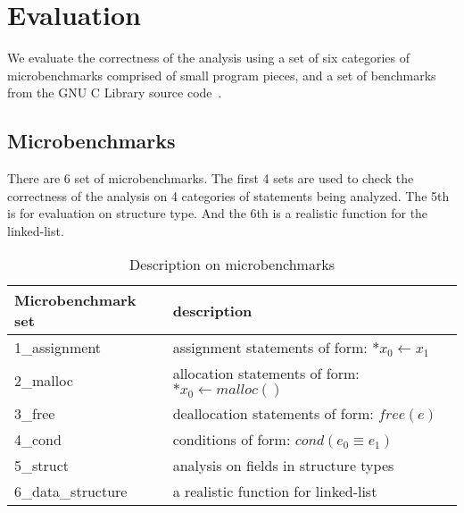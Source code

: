 \section{Evaluation}
\label{s:evaluation}

We evaluate the correctness of the analysis using a set of six categories of 
microbenchmarks comprised of small program pieces, and a set of benchmarks 
from the GNU C Library source code~\cite{glibc}.

\subsection{Microbenchmarks}
\label{microbenchmark}

There are 6 set of microbenchmarks. The first 4 sets are used to check the 
correctness of the analysis on 4 categories of statements being analyzed. 
The 5th is for evaluation on structure type. And the 6th is a realistic 
function for the linked-list.



\begin{table}[t!]
  \centering
    \begin{tabular}{|l|l|}
    \hline
    Microbenchmark set & description\\
    \hline
    \hline
    1\_assignment & assignment statements of form: $*x_0\gets x_1$ \\
    \hline
    2\_malloc & allocation statements of form: $*x_0\gets malloc()$ \\
    \hline
    3\_free & deallocation statements of form: $free(e)$ \\
    \hline
    4\_cond & conditions of form: $cond(e_0\equiv e_1)$ \\
    \hline
    5\_struct & analysis on fields in structure types \\
    \hline
    6\_data\_structure & a realistic function for linked-list \\
    \hline
    \end{tabular}
    \caption{\label{tbl:micro} Description on microbenchmarks}
\label{tbl:microbenchmark}
\end{table}


